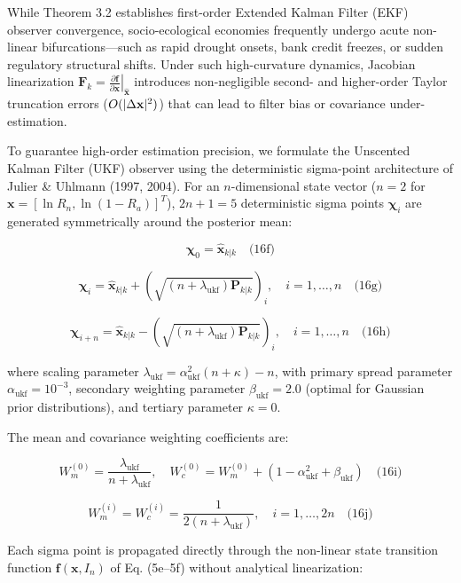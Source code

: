 \documentclass[preprint,12pt,authoryear]{elsarticle}
\theoremstyle{definition}
\begin{document}
While Theorem 3.2 establishes first-order Extended Kalman Filter (EKF) observer convergence, socio-ecological economies frequently undergo acute non-linear bifurcations---such as rapid drought onsets, bank credit freezes, or sudden regulatory structural shifts. Under such high-curvature dynamics, Jacobian linearization $\mathbf{F}_k = \left. \frac{\partial \mathbf{f}}{\partial \mathbf{x}} \right|_{\hat{\mathbf{x}}}$ introduces non-negligible second- and higher-order Taylor truncation errors ($O(\\|\Delta \mathbf{x}\\|^2)$) that can lead to filter bias or covariance under-estimation.

To guarantee high-order estimation precision, we formulate the Unscented Kalman Filter (UKF) observer using the deterministic sigma-point architecture of Julier \& Uhlmann (1997, 2004). For an $n$-dimensional state vector ($n=2$ for $\mathbf{x} = [\ln R_n, \ln(1 - R_a)]^T$), $2n+1 = 5$ deterministic sigma points $\boldsymbol{\chi}_i$ are generated symmetrically around the posterior mean:

$$\boldsymbol{\chi}_0 = \hat{\mathbf{x}}_{k|k} \quad \text{(16f)}$$

$$\boldsymbol{\chi}_i = \hat{\mathbf{x}}_{k|k} + \left(\sqrt{(n + \lambda_{\text{ukf}})\mathbf{P}_{k|k}}\right)_i, \quad i = 1, \dots, n \quad \text{(16g)}$$

$$\boldsymbol{\chi}_{i+n} = \hat{\mathbf{x}}_{k|k} - \left(\sqrt{(n + \lambda_{\text{ukf}})\mathbf{P}_{k|k}}\right)_i, \quad i = 1, \dots, n \quad \text{(16h)}$$

where scaling parameter $\lambda_{\text{ukf}} = \alpha_{\text{ukf}}^2(n + \kappa) - n$, with primary spread parameter $\alpha_{\text{ukf}} = 10^{-3}$, secondary weighting parameter $\beta_{\text{ukf}} = 2.0$ (optimal for Gaussian prior distributions), and tertiary parameter $\kappa = 0$.

The mean and covariance weighting coefficients are:

$$W_m^{(0)} = \frac{\lambda_{\text{ukf}}}{n + \lambda_{\text{ukf}}}, \quad W_c^{(0)} = W_m^{(0)} + (1 - \alpha_{\text{ukf}}^2 + \beta_{\text{ukf}}) \quad \text{(16i)}$$

$$W_m^{(i)} = W_c^{(i)} = \frac{1}{2(n + \lambda_{\text{ukf}})}, \quad i = 1, \dots, 2n \quad \text{(16j)}$$

Each sigma point is propagated directly through the non-linear state transition function $\mathbf{f}(\mathbf{x}, I_n)$ of Eq. (5e--5f) without analytical linearization:
\end{document}
